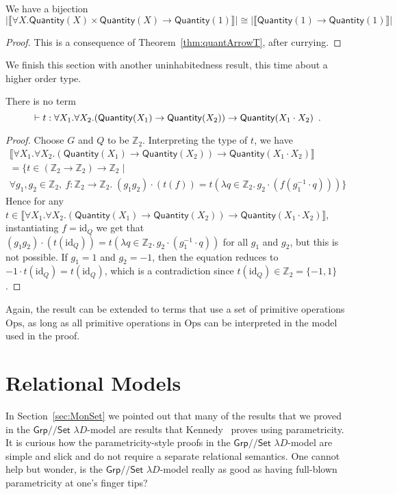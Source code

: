\documentclass[a4paper,UKenglish]{lipics}
\theoremstyle{plain}
\newcommand{\msf}[1]{\mathsf{#1}} %
\newcommand{\Grp}{\msf{Grp}}
\newcommand{\Set}{\msf{Set}}
\newcommand{\Lslice}[1]{#1/\!/\Set}
\newcommand{\GrpSet}{\Lslice{\Grp}}
\newcommand{\bbZ}{\mathbb{Z}}
\newcommand{\sem}[1]{\ensuremath{\llbracket #1 \rrbracket}}
\newcommand{\qnt}{\msf{Quantity}}
\newcommand{\id}{\mathrm{id}}
\begin{document}
\begin{theorem}We have a bijection
 \label{thm:AppSubs}
 \[
 |\sem{\forall X . \qnt(X) \times \qnt(X) \rightarrow \qnt(1)}| \cong |\sem{\qnt(1)\rightarrow \qnt(1)}|
 \]
\end{theorem}
\begin{proof}
This is a consequence of Theorem~\ref{thm:quantArrowT}, after currying.
\end{proof}

We finish this section with another uninhabitedness result, this time
about a higher order type.

\begin{theorem}\label{thm:UninhabInt}
There is no term
\[
\vdash t : \forall X_1. \forall X_2. (\qnt(X_1) \rightarrow \qnt(X_2)) \rightarrow \qnt(X_1 \cdot X_2)\enspace \text.
\]
\end{theorem}
\begin{proof}
Choose $G$ and $Q$ to be $\bbZ_2$. Interpreting the type of $t$, we have
 \begin{multline*}
\sem{\forall X_1. \forall X_2. (\qnt(X_1) \rightarrow \qnt(X_2)) \rightarrow \qnt(X_1 \cdot X_2)} \\=
\{ t \in (\bbZ_2 {\rightarrow} \bbZ_2) {\rightarrow} \bbZ_2 \; | \\ \forall g_1,  g_2 \in \bbZ_2,\ f:\bbZ_2{\to} \bbZ_2. \; (g_1 g_2) \cdot (t(f))=
t(\lambda q\in \bbZ_2.\,g_2\cdot (f(g_1^{-1}\cdot q))) \}
 \end{multline*}
Hence for any $t \in  \sem{\forall X_1. \forall X_2. (\qnt(X_1) \rightarrow \qnt(X_2)) \rightarrow \qnt(X_1 \cdot X_2)}$, instantiating $f=\id_Q$ we get that $(g_1 g_2) \cdot (t(\id_Q)) = t(\lambda q\in \bbZ_2.\,g_2\cdot (g_1^{-1}\cdot q))$ for all $g_1$ and $g_2$, but this is not possible. If $g_1 = 1$ and $g_2 = -1$, then the equation reduces to $-1\cdot t(\id_Q)=t(\id_Q)$, which is a contradiction since $t(\id_Q) \in \bbZ_2 = \{-1, 1\}$.
\end{proof}
Again, the result can be extended to terms that use a set of primitive
operations $\mathrm{Ops}$, as long as all primitive operations in
$\mathrm{Ops}$ can be interpreted in the model used in the proof.

\section{Relational Models}
\label{sec:param}
In Section~\ref{sec:MonSet} we pointed out that many of the results that we proved in the $\GrpSet$ $\lambda D$-model are results that  Kennedy~\cite{Kennedy:1997:RPU:263699.263761} proves using parametricity. It is curious how the parametricity-style proofs in the $\GrpSet$ $\lambda D$-model are simple and slick and do not require a separate relational semantics. One cannot help but wonder, is the $\GrpSet$ $\lambda D$-model really as good as having full-blown parametricity at one's finger tips?
\end{document}
